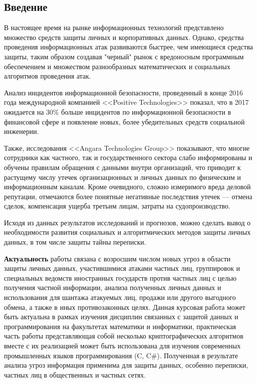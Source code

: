\newpage
\parindent=1cm %
\begin{center}
	\section*{Введение} %
	\pagestyle{plain} %
	\setcounter{page}{3} %
\end{center}

В настоящее время на рынке информационных технологий представлено множество средств защиты личных и корпоративных данных. Однако, средства проведения информационных атак  развиваются  быстрее, чем имеющиеся средства защиты, таким образом создавая "черный"  рынок с вредоносным программным обеспечением  и множеством разнообразных математических и социальных  алгоритмов проведения атак. 

Анализ инцидентов информационной безопасности, проведенный в конце 2016 года международной компанией <<Positive Technologies>> показал, что в 2017 ожидается на 30\% больше инцидентов по информационной безопасности в финансовой сфере и появление новых, более убедительных средств социальной инженерии. %

Также, исследования  <<Angara Technologies Group>> 
показывают, что многие сотрудники  как частного, так и государственного сектора слабо информированы и обучены правилам обращения с данными внутри организаций, что приводит к растущему числу утечек организационных и личных данных по физическим и информационным каналам.  Кроме очевидного,  сложно измеримого вреда деловой репутации, отмечаются  более понятные негативные последствия утечек — отмена сделок, компенсация ущерба третьим лицам, затраты на судопроизводство. %

Исходя из данных результатов исследований и прогнозов, можно сделать вывод о необходимости развития социальных  и алгоритмических  методов защиты личных данных, в том числе защиты тайны переписки.   

\textbf{Актуальность} работы  связана с возросшим числом новых угроз в области защиты личных данных, участившимися атаками частных лиц, группировок и специальных ведомств иностранных государств против частных лиц с целью получения частной информации, анализа полученных личных данных   и использования для шантажа атакуемых лиц, продажи или другого выгодного обмена, а также  в иных противозаконных целях. Данная курсовая работа может быть актуальна в рамках изучения дисциплин связанных с защитой данных и программирования на факультетах математики и информатики, практическая часть работы представляющая собой несколько криптографических алгоритмов вместе с их реализацией может быть использована для изучения современных промышленных языков программирования (C, C\#). Полученная в результате анализа угроз информация применима для защиты   данных, особенно переписки, частных лиц в общественных и частных сетях. 

